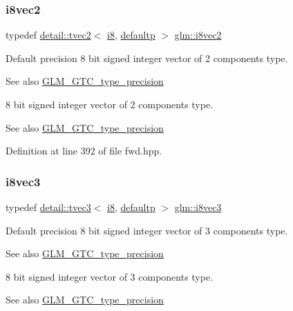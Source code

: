 \subsubsection{\texorpdfstring{i8vec2}{i8vec2}}
{\footnotesize\ttfamily typedef \hyperlink{structglm_1_1detail_1_1tvec2}{detail\+::tvec2}$<$ \hyperlink{group__gtc__type__precision_gaae064be68b7d36cd7910c16e8ad18bba}{i8}, \hyperlink{namespaceglm_a0f04f086094c747d227af4425893f545a9d21ccd8b5a009ec7eb7677befc3bf51}{defaultp} $>$ \hyperlink{group__gtc__type__precision_gafd7bbd3878c298014276975f999a8677}{glm\+::i8vec2}}

Default precision 8 bit signed integer vector of 2 components type. \begin{DoxySeeAlso}{See also}
\hyperlink{group__gtc__type__precision}{G\+L\+M\+\_\+\+G\+T\+C\+\_\+type\+\_\+precision}
\end{DoxySeeAlso}
8 bit signed integer vector of 2 components type. \begin{DoxySeeAlso}{See also}
\hyperlink{group__gtc__type__precision}{G\+L\+M\+\_\+\+G\+T\+C\+\_\+type\+\_\+precision} 
\end{DoxySeeAlso}


Definition at line 392 of file fwd.\+hpp.

\mbox{\label{group__gtc__type__precision_gae1e3127c58fbf1b6fbf28885cfd3dfad}} 
\subsubsection{\texorpdfstring{i8vec3}{i8vec3}}
{\footnotesize\ttfamily typedef \hyperlink{structglm_1_1detail_1_1tvec3}{detail\+::tvec3}$<$ \hyperlink{group__gtc__type__precision_gaae064be68b7d36cd7910c16e8ad18bba}{i8}, \hyperlink{namespaceglm_a0f04f086094c747d227af4425893f545a9d21ccd8b5a009ec7eb7677befc3bf51}{defaultp} $>$ \hyperlink{group__gtc__type__precision_gae1e3127c58fbf1b6fbf28885cfd3dfad}{glm\+::i8vec3}}

Default precision 8 bit signed integer vector of 3 components type. \begin{DoxySeeAlso}{See also}
\hyperlink{group__gtc__type__precision}{G\+L\+M\+\_\+\+G\+T\+C\+\_\+type\+\_\+precision}
\end{DoxySeeAlso}
8 bit signed integer vector of 3 components type. \begin{DoxySeeAlso}{See also}
\hyperlink{group__gtc__type__precision}{G\+L\+M\+\_\+\+G\+T\+C\+\_\+type\+\_\+precision} 
\end{DoxySeeAlso}


